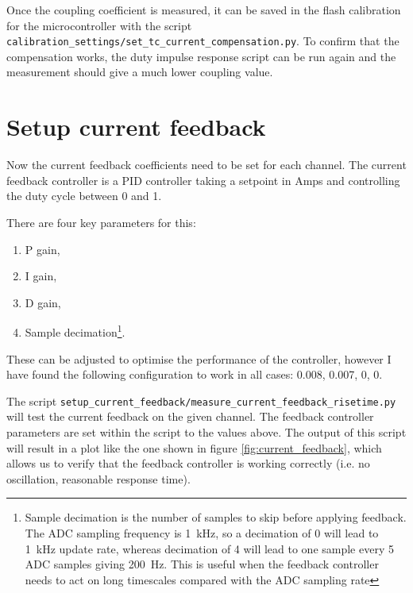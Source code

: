 \documentclass{article}
\begin{document}
Once the coupling coefficient is measured, it can be saved in the flash calibration for the microcontroller with the script \texttt{calibration\_settings/set\_tc\_current\_compensation.py}. To confirm that the compensation works, the duty impulse response script can be run again and the measurement should give a much lower coupling value.


\clearpage
\section{Setup current feedback}

Now the current feedback coefficients need to be set for each channel.
The current feedback controller is a PID controller taking a setpoint in Amps and controlling the duty cycle between 0 and 1.

There are four key parameters for this:
\begin{enumerate}
\item P gain,
\item I gain,
\item D gain,
\item Sample decimation\footnote{Sample decimation is the number of samples to skip before applying feedback. The ADC sampling frequency is \SI{1}{kHz}, so a decimation of 0 will lead to \SI{1}{kHz} update rate, whereas decimation of 4 will lead to one sample every 5 ADC samples giving \SI{200}{Hz}. This is useful when the feedback controller needs to act on long timescales compared with the ADC sampling rate}.
\end{enumerate}
These can be adjusted to optimise the performance of the controller, however I have found the following configuration to work in all cases:
0.008, 0.007, 0, 0.

The script \texttt{setup\_current\_feedback/measure\_current\_feedback\_risetime.py} will test the current feedback on the given channel. The feedback controller parameters are set within the script to the values above. The output of this script will result in a plot like the one shown in figure \ref{fig:current_feedback}, which allows us to verify that the feedback controller is working correctly (i.e. no oscillation, reasonable response time).
\end{document}
